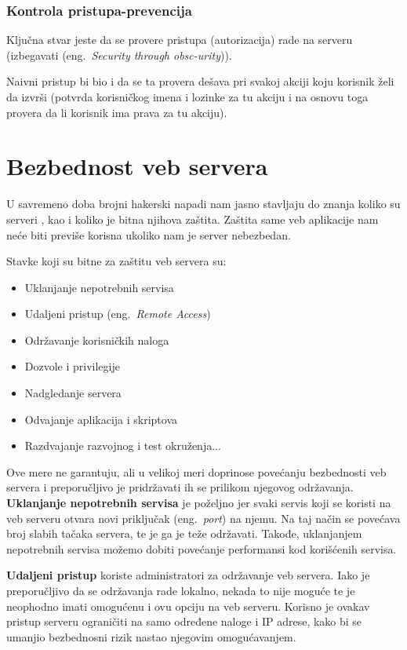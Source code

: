 \documentclass[a4paper]{article}
\begin{document}
\subsubsection{Kontrola pristupa-prevencija}

Ključna stvar jeste da se provere pristupa (autorizacija) rade na serveru (izbegavati (eng.~{\em Security through obsc-urity}\cite{AS})). 

Naivni pristup bi bio i da se ta provera dešava pri svakoj akciji koju korisnik želi da izvrši (potvrda korisničkog imena i lozinke za tu akciju i na osnovu toga provera da li korisnik ima prava za tu akciju).

\section{Bezbednost veb servera}

U savremeno doba brojni hakerski napadi nam jasno stavljaju do znanja koliko su serveri , kao i koliko je bitna njihova zaštita. Zaštita same veb aplikacije nam neće biti previše korisna ukoliko nam je server nebezbedan.

Stavke koji su bitne za zaštitu veb servera su:
\begin{itemize}
	\item Uklanjanje nepotrebnih servisa
	\item Udaljeni pristup (eng.~{\em Remote Access})
	\item Održavanje korisničkih naloga
	\item Dozvole i privilegije
	\item Nadgledanje servera
	\item Odvajanje aplikacija i skriptova
	\item Razdvajanje razvojnog i test okruženja...
\end{itemize}

Ove mere ne garantuju, ali u velikoj meri doprinose povećanju bezbednosti veb servera i preporučljivo je pridržavati ih se prilikom njegovog održavanja.\\

\textbf{Uklanjanje nepotrebnih servisa} je poželjno jer svaki servis koji se koristi na veb serveru otvara novi priključak (eng.~{\em port}) na njemu. Na taj način se povećava broj slabih tačaka servera, te je ga je teže održavati. Takođe, uklanjanjem nepotrebnih servisa možemo dobiti povećanje performansi kod korišćenih servisa.

\textbf{Udaljeni pristup} koriste administratori za održavanje veb servera. Iako je preporučljivo da se održavanja rade lokalno, nekada to nije moguće te je neophodno imati omogućenu i ovu opciju na veb serveru. Korisno je ovakav pristup serveru ograničiti na samo određene naloge i IP adrese, kako bi se umanjio bezbednosni rizik nastao njegovim omogućavanjem.
\end{document}
